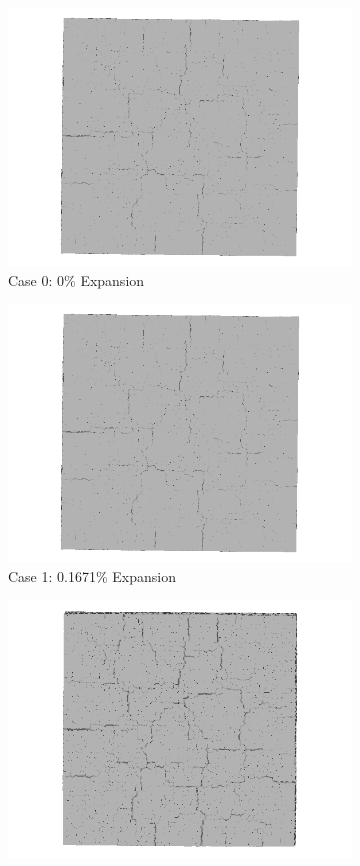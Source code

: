 \begin{figure}[!h]
\centering

    \begin{subfigure}{.5\textwidth}
      \centering
      \includegraphics[width=.8\linewidth]{Files/exp_3D/DEF/A30X-5C_1_3ds.png}
    \caption{Case 0: 0\% Expansion}
    \end{subfigure}%
    \begin{subfigure}{.5\textwidth}
      \centering
      \includegraphics[width=.8\linewidth]{Files/exp_3D/DEF/A30X-5C_1_3ds.png}
    \caption{Case 1: 0.1671\% Expansion}
    \end{subfigure}
    \begin{subfigure}{.5\textwidth}
      \centering
      \includegraphics[width=.8\linewidth]{Files/exp_3D/DEF/A30X-5C_2_3ds.png}

\end{subfigure}
\end{figure}
